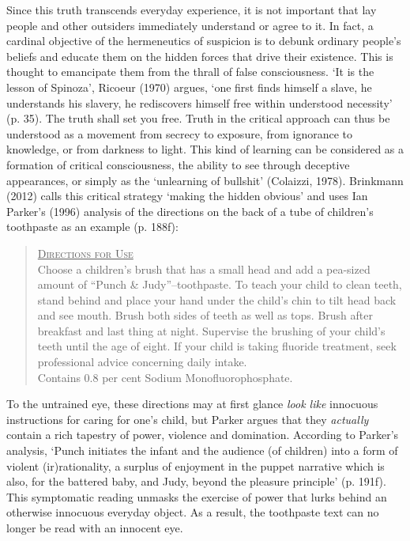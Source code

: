 \begin{adjmulticols}{2}{0mm}{0mm}
Since this truth transcends everyday experience, it is not important that lay people and other outsiders immediately understand or agree to it. In fact, a cardinal objective of the hermeneutics of suspicion is to debunk ordinary people’s beliefs and educate them on the hidden forces that drive their existence. This is thought to emancipate them from the thrall of false consciousness. ‘It is the lesson of Spinoza’, Ricoeur (1970) argues, ‘one first finds himself a slave, he understands his slavery, he rediscovers himself free within understood necessity’ (p. 35). The truth shall set you free. Truth in the critical approach can thus be understood as a movement from secrecy to exposure, from ignorance to knowledge, or from darkness to light. This kind of learning can be considered as a formation of critical consciousness, the ability to see through deceptive appearances, or simply as the ‘unlearning of bullshit’ (Colaizzi, 1978). Brinkmann (2012) calls this critical strategy ‘making the hidden obvious’ and uses Ian Parker’s (1996) analysis of the directions on the back of a tube of children’s toothpaste as an example (p. 188f): 
    \blockquote{\textnormal{\scshape\underline{Directions for Use}}
    \\Choose a children’s brush that has a small head and add a pea-sized amount of \enquote{Punch \& Judy}--toothpaste. To teach your child to clean teeth, stand behind and place your hand under the child’s chin to tilt head back and see mouth. Brush both sides of teeth as well as tops. Brush after breakfast and last thing at night. Supervise the brushing of your child’s teeth until the age of eight. If your child is taking fluoride treatment, seek professional advice concerning daily intake.
    \\Contains 0.8 per cent Sodium Monofluorophosphate.}
To the untrained eye, these directions may at first glance \textit{look like} innocuous instructions for caring for one’s child, but Parker argues that they \textit{actually} contain a rich tapestry of power, violence and domination. According to Parker’s analysis, ‘Punch initiates the infant and the audience (of children) into a form of violent (ir)rationality, a surplus of enjoyment in the puppet narrative which is also, for the battered baby, and Judy, beyond the pleasure principle’ (p. 191f). This symptomatic reading unmasks the exercise of power that lurks behind an otherwise innocuous everyday object. As a result, the toothpaste text can no longer be read with an innocent eye. 


\end{adjmulticols}
